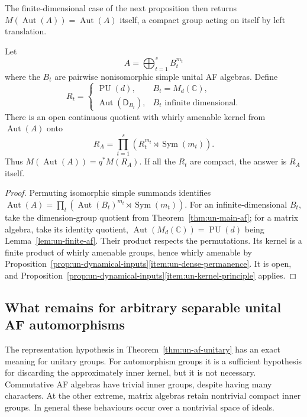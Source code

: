 The finite-dimensional case of the next proposition then returns
\(M(\operatorname{Aut}(A))=\operatorname{Aut}(A)\) itself, a compact group acting on itself by left
translation.

\begin{proposition}\label{prop:un-finite-simple-sum}
Let
\[
 A=\bigoplus_{t=1}^s B_t^{m_t}
\]
where the \(B_t\) are pairwise nonisomorphic simple unital AF
algebras. Define
\[
 R_t=
 \begin{cases}
 \operatorname{PU}(d),& B_t=M_d(\mathbb C),\\
 \operatorname{Aut}(\mathsf D_{B_t}),& B_t\text{ infinite dimensional}.
 \end{cases}
\]
There is an open continuous quotient with whirly amenable kernel
from \(\operatorname{Aut}(A)\) onto
\[
 R_A=\prod_{t=1}^s (R_t^{m_t}\rtimes\operatorname{Sym}(m_t)).
\]
Thus \(M(\operatorname{Aut}(A))=q^*M(R_A)\).
If all the \(R_t\) are compact, the answer is \(R_A\) itself.
\end{proposition}
\begin{proof}
Permuting isomorphic simple summands identifies
\(\operatorname{Aut}(A)=\prod_t(\operatorname{Aut}(B_t)^{m_t}\rtimes\operatorname{Sym}(m_t))\).
For an infinite-dimensional \(B_t\), take the dimension-group
quotient from Theorem~\ref{thm:un-main-af}; for a matrix algebra,
take its identity quotient, \(\operatorname{Aut}(M_d(\mathbb C))=\operatorname{PU}(d)\) being
Lemma~\ref{lem:un-finite-af}.
Their product respects the permutations. Its kernel is a finite
product of whirly amenable groups, hence whirly amenable by
Proposition~\ref{prop:un-dynamical-inputs}\ref{item:un-dense-permanence}.
It is open, and Proposition~\ref{prop:un-dynamical-inputs}\ref{item:un-kernel-principle} applies.
\end{proof}


\subsection{What remains for arbitrary separable unital AF automorphisms}
\label{sec:un-af-gap}

The representation hypothesis in Theorem~\ref{thm:un-af-unitary} has an
exact meaning for unitary groups. For automorphism groups it is a
sufficient hypothesis for discarding the approximately inner kernel,
but it is not necessary. Commutative AF algebras have trivial inner
groups, despite having many characters. At the other extreme,
matrix algebras retain nontrivial compact inner groups.
In general these behaviours occur over a nontrivial space of ideals.

